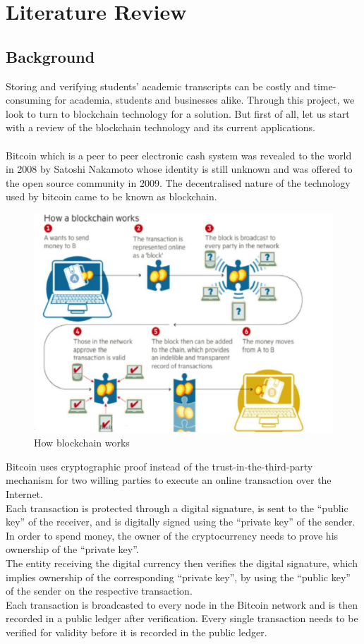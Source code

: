 \chapter{Literature Review}

\section{Background}

Storing and verifying students' academic transcripts can be costly and time-consuming for academia, students and businesses alike. Through this project, we look to turn to blockchain technology for a solution. But first of all, let us start with a review of the blockchain technology and its current applications.\\\\
Bitcoin which is a peer to peer electronic cash system was revealed to the world in 2008 by Satoshi Nakamoto whose identity is still unknown and was offered to the open source community in 2009. The decentralised nature of the technology used by bitcoin came to be known as blockchain.\\
\begin{figure}[!h]
\centering
\includegraphics[scale=0.3]{images/howitworks.jpg}
\caption{How blockchain works}
\end{figure}
Bitcoin uses cryptographic proof instead of the trust-in-the-third-party mechanism for two willing parties to execute an online transaction over the Internet.\\
Each transaction is protected through a digital signature, is sent to the “public key” of the receiver, and is digitally signed using the “private key” of the sender. In order to spend money, the owner of the cryptocurrency needs to prove his ownership of the “private key”.\\
The entity receiving the digital currency then verifies the digital signature, which implies ownership of the corresponding “private key”, by using the “public key” of the sender on the respective transaction.\\
Each transaction is broadcasted to every node in the Bitcoin network and is then recorded in a public ledger after verification. Every single transaction needs to be verified for validity before it is recorded in the public ledger.\\\\
